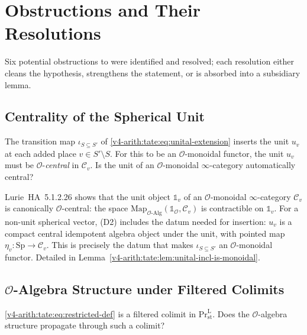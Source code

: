 \section{Obstructions and Their Resolutions}
\label{v4-arith:tate:table}

Six potential obstructions to  were
identified and resolved; each resolution either cleans the hypothesis,
strengthens the statement, or is absorbed into a subsidiary lemma.

\subsection{Centrality of the Spherical Unit}

\begin{obstruction}
The transition map \(\iota_{S\subseteq S'}\) of
\eqref{v4-arith:tate:eq:unital-extension} inserts the unit \(u_{v}\)
at each added place \(v\in S'\setminus S\). For this to be an
\(\mathcal{O}\)-monoidal functor, the unit \(u_{v}\) must be
\(\mathcal{O}\)-\emph{central} in \(\mathcal{C}_{v}\). Is the unit of an
\(\mathcal{O}\)-monoidal \(\infty\)-category automatically central?
\end{obstruction}

\begin{correction}
Lurie~HA~5.1.2.26 shows that the unit object \(\mathbb{1}_{v}\)
of an \(\mathcal{O}\)-monoidal \(\infty\)-category \(\mathcal{C}_{v}\) is
canonically \(\mathcal{O}\)-central: the space
\(\mathrm{Map}_{\mathcal{O}\text{-}\mathrm{Alg}}(\mathbb{1}_{\mathcal{O}},\mathcal{C}_{v})\)
is contractible on \(\mathbb{1}_{v}\). For a non-unit spherical vector,
(D2) includes the datum needed for insertion: \(u_{v}\) is a
compact central idempotent algebra object under the unit, with pointed
map \(\eta_{v}\colon\mathrm{Sp}\to\mathcal{C}_{v}\). This is precisely
the datum that makes \(\iota_{S\subseteq S'}\) an
\(\mathcal{O}\)-monoidal functor. Detailed in
Lemma~\ref{v4-arith:tate:lem:unital-incl-is-monoidal}.
\end{correction}

\subsection{\(\mathcal{O}\)-Algebra Structure under Filtered Colimits}

\begin{obstruction}
\eqref{v4-arith:tate:eq:restricted-def} is a filtered colimit in
\(\mathrm{Pr}^{\mathrm{L}}_{\mathrm{st}}\). Does the
\(\mathcal{O}\)-algebra structure propagate through such a colimit?
\end{obstruction}

